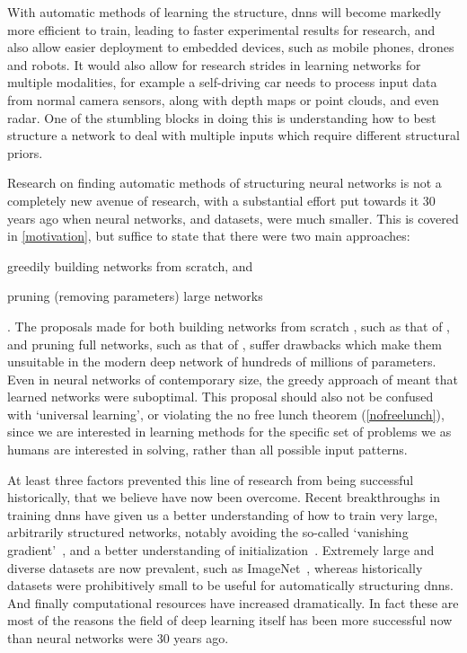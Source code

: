 \documentclass[thesis]{subfiles}
\begin{document}
With automatic methods of learning the structure, \glspl{dnn} will become markedly more efficient to train, leading to faster experimental results for research, and also allow easier deployment to embedded devices, such as mobile phones, drones and robots. It would also allow for research strides in learning networks for multiple modalities, for example a self-driving car needs to process input data from normal camera sensors, along with depth maps or point clouds, and even radar. One of the stumbling blocks in doing this is understanding how to best structure a network to deal with multiple inputs which require different structural priors.

Research on finding automatic methods of structuring neural networks is not a completely new avenue of research, with a substantial effort put towards it 30 years ago when neural networks, and datasets, were much smaller. This is covered in \cref{motivation}, but suffice to state that there were two main approaches:
\begin{enumerate*}[label= (\textbf{\roman*})]
	\item greedily building networks from scratch, and 
	\item pruning (removing parameters) large networks
\end{enumerate*}. The proposals made for both building networks from scratch , such as that of \citet{Fahlman1989}, and pruning full networks, such as that of \citet{lecun1989optimal}, suffer drawbacks which make them unsuitable in the modern deep network of hundreds of millions of parameters. Even in neural networks of contemporary size, the greedy approach of \citet{Fahlman1989} meant that learned networks were suboptimal. This proposal should also not be confused with `universal learning', or violating the no free lunch theorem (\cref{nofreelunch}), since we are interested in learning methods for the specific set of problems we as humans are interested in solving, rather than all possible input patterns.

At least three factors prevented this line of research from being successful historically, that we believe have now been overcome. Recent breakthroughs in training \glspl{dnn} have given us a better understanding of how to train very large, arbitrarily structured networks, notably avoiding the so-called `vanishing gradient'~\citep{Ioffe2015,He2016}, and a better understanding of initialization~\citep{He2015b}. Extremely large and diverse datasets are now prevalent, such as ImageNet~\citep{ILSVRC2015}, whereas historically datasets were prohibitively small to be useful for automatically structuring \glspl{dnn}. And finally computational resources have increased dramatically. In fact these are most of the reasons the field of deep learning itself has been more successful now than neural networks were 30 years ago.
\end{document}
